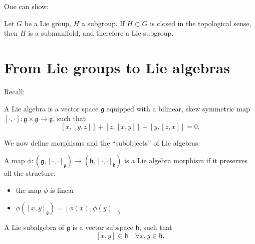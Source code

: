 One can show:
\begin{theorem}
    Let $G$ be a Lie group, $H$ a subgroup.
    If $H \subset G$ is closed in the topological sense, then $H$ is a submanifold, and therefore a Lie subgroup.
\end{theorem}


\section{From Lie groups to Lie algebras}

Recall: 
\begin{definition}
    A Lie algebra is a vector space $\mathfrak g$ equipped with a bilinear, skew symmetric map  $[\cdot , \cdot ]: \mathfrak g \times  \mathfrak g \to  \mathfrak g$, such that
    \[
        [x, [y, z]] + 
        [z, [x, y]] + 
        [y, [z, x]] = 0
    .\] 
\end{definition}
We now define morphisms and the  ``subobjects'' of Lie algebras:

\begin{definition}
    A map $\phi: (\mathfrak g, [\cdot , \cdot ]_{\mathfrak g} ) \to  (\mathfrak h, [\cdot , \cdot ]_{\mathfrak h} )$ is a Lie algebra morphism if 
    it preserves all the structure:
    \begin{itemize}
        \item the map $\phi$ is linear
         \item $\phi([x, y]_{\mathfrak g}) = [\phi(x), \phi(y)]_{\mathfrak h}$
    \end{itemize}
\end{definition}


\begin{definition}
    A Lie subalgebra of $\mathfrak g$ is a vector subspace $\mathfrak h$, such that
    \[
        [x, y] \in  \mathfrak h \quad \forall x, y \in \mathfrak h
    .\] 
\end{definition}

